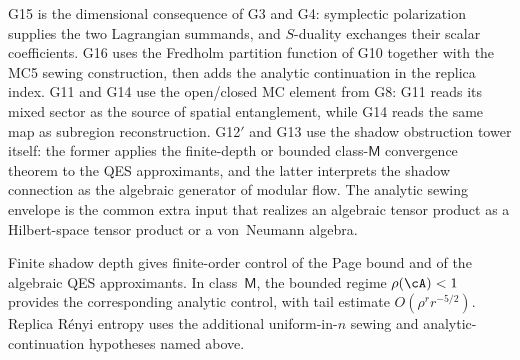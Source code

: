 \begin{remark}
\label{rem:thqg-g11-g16-dependencies}
G15 is the dimensional consequence of G3 and G4: symplectic
polarization supplies the two Lagrangian summands, and $S$-duality
exchanges their scalar coefficients.  G16 uses the Fredholm partition
function of G10 together with the MC5 sewing construction, then adds
the analytic continuation in the replica index.  G11 and G14 use the
open/closed MC element from G8: G11 reads its mixed sector as the
source of spatial entanglement, while G14 reads the same map as
subregion reconstruction.  G12$'$ and G13 use the shadow obstruction
tower itself: the former applies the finite-depth or bounded
class-$\mathsf M$ convergence theorem to the QES approximants, and the
latter interprets the shadow connection as the algebraic generator of
modular flow.  The analytic sewing envelope is the common extra input
that realizes an algebraic tensor product as a Hilbert-space tensor
product or a von~Neumann algebra.
\end{remark}

\begin{remark}
\label{rem:thqg-convergent-advantage}
Finite shadow depth gives finite-order control of the Page
bound and of the algebraic QES approximants.  In class~$\mathsf M$,
the bounded regime $\rho(\cA)<1$ provides the corresponding analytic
control, with tail estimate $O(\rho^r r^{-5/2})$.  Replica R\'enyi
entropy uses the additional uniform-in-$n$ sewing and
analytic-continuation hypotheses named above.
\end{remark}
